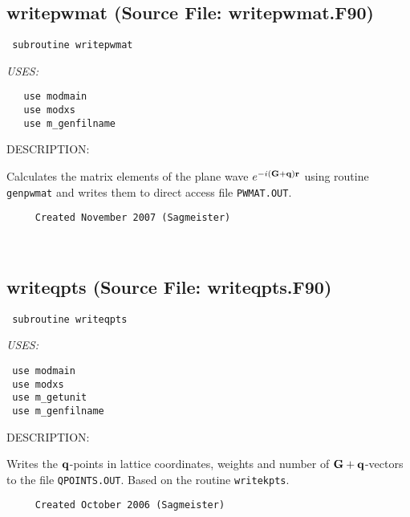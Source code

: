 \documentclass[11pt]{article}
\begin{document}
\subsection{writepwmat (Source File: writepwmat.F90)}


\begin{verbatim} subroutine writepwmat\end{verbatim}{\em USES:}
\begin{verbatim}   use modmain
   use modxs
   use m_genfilname\end{verbatim}
{\sf DESCRIPTION:\\ }


     Calculates the matrix elements of the plane wave
     $e^{-i({\bf G}+{\bf q}){\bf r}}$
     using routine {\tt genpwmat} and writes them to
     direct access file {\tt PWMAT.OUT}.
  
\begin{verbatim}     Created November 2007 (Sagmeister)\end{verbatim}


 
 
\mbox{}\hrulefill\ 
 
\subsection{writeqpts (Source File: writeqpts.F90)}


\begin{verbatim} subroutine writeqpts\end{verbatim}{\em USES:}
\begin{verbatim} use modmain
 use modxs
 use m_getunit
 use m_genfilname\end{verbatim}
{\sf DESCRIPTION:\\ }


     Writes the ${\bf q}$-points in lattice coordinates, weights and number of
     ${\bf G+q}$-vectors to the file {\tt QPOINTS.OUT}. Based on the routine 
     {\tt writekpts}.
  
\begin{verbatim}     Created October 2006 (Sagmeister)\end{verbatim}

\end{document}
